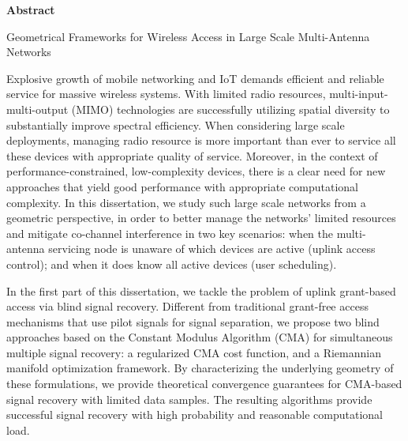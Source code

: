 \newpage
\centerline{\Huge \bf {Abstract}} 
\vspace{5pt}

\begin{center}
	Geometrical Frameworks for Wireless Access in Large Scale Multi-Antenna Networks\\
\end{center}
\vspace{18pt}

Explosive growth of mobile networking and IoT demands efficient and reliable service for massive wireless systems. With limited radio resources, multi-input-multi-output (MIMO) technologies are successfully utilizing spatial diversity to substantially improve spectral efficiency.  
When considering large scale deployments, managing radio resource is more important than ever to service all these devices with appropriate quality of service. Moreover, in the context of performance-constrained, low-complexity devices, there is a clear need for new approaches that yield good performance with appropriate computational complexity.
In this dissertation, we study such large scale networks from a geometric perspective, in order to
better manage the networks' limited resources and mitigate co-channel interference in two key scenarios: when the multi-antenna servicing node is unaware of which devices are active (uplink access control); and when it does know all active devices (user scheduling). 

In the first part of this dissertation, we tackle the problem of uplink grant-based access via blind signal recovery. 
Different from traditional grant-free access mechanisms that use pilot signals for signal separation, we propose two blind approaches based on the Constant Modulus Algorithm (CMA) for simultaneous multiple signal recovery: a regularized CMA cost function, and a Riemannian manifold optimization framework. By characterizing the underlying geometry of these formulations, we provide theoretical convergence guarantees for CMA-based signal recovery with limited data samples. The resulting algorithms provide successful signal recovery with high probability and reasonable computational load.

